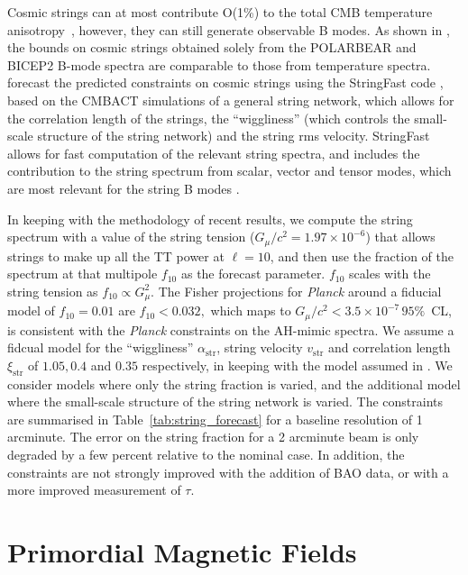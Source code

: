 Cosmic strings can at most contribute O(1\%) to the total CMB temperature anisotropy~\cite{Ade:2013xla,Lizarraga:2014xza,Lazanu:2014eya}, however, they can still generate observable B modes. As shown in \cite{Moss:2014cra}, the bounds on cosmic strings obtained solely from the POLARBEAR \cite{Ade:2014afa} and BICEP2  \cite{Ade:2014xna} B-mode spectra are comparable to those from temperature spectra. 
forecast the predicted constraints on cosmic strings using the StringFast code \cite{Foreman:2011uj}, based on the CMBACT simulations \cite{Pogosian:1999np} of a general string network, which allows for the correlation length of the strings, the ``wiggliness'' (which controls the small-scale structure of the string network) and the string rms velocity. StringFast allows for fast computation of the relevant string spectra, and includes the contribution to the string spectrum from scalar, vector and tensor modes, which are most relevant for the string B modes \cite{Foreman:2011uj}.

In keeping with the methodology of recent results, we compute the string spectrum with a value of the string tension ($G_\mu/c^2=1.97\times10^{-6}$) that allows strings to make up all the TT power at $\ell=10$, and then use the fraction of the spectrum at that multipole $f_{10}$ as the forecast parameter. $f_{10}$ scales with the string tension as $f_{10} \propto G_\mu^2.$ The Fisher projections for {\it Planck\/} around a fiducial model of $f_{10}=0.01$ are $f_{10}<0.032,$ which maps to $G_\mu/c^2 < 3.5\times 10^{-7}\, 95\%$~CL, is consistent with the {\it Planck\/} constraints on the AH-mimic spectra.
We assume a fidcual model for the ``wiggliness'' $\alpha_\mathrm{str}$, string velocity $v_\mathrm{str}$ and correlation length $\xi_\mathrm{str}$ of $1.05, 0.4$ and $0.35$ respectively, in keeping with the model assumed in \cite{Foreman:2011uj}. We consider models where only the string fraction is varied, and the additional model where the small-scale structure of the string network is varied. The constraints are summarised in Table~\ref{tab:string_forecast} for a baseline resolution of 1 arcminute. The error on the string fraction for a 2 arcminute beam is only degraded by a few percent relative to the nominal case. In addition, the constraints are not strongly improved with the addition of BAO data, or with a more improved measurement of $\tau$.


\section{Primordial Magnetic Fields}

